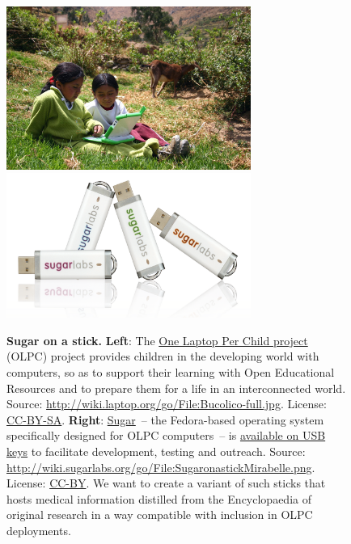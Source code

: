 \documentclass[final,authoryear,3p]{elsarticle-open-drafting}
\begin{document}
\begin{figure}[!h]
	\begin{center}
		\includegraphics[width=8cm]{Images/Bucolico-full-jpg2png.png}
		\includegraphics[width=8cm]{Images/SugaronastickMirabelle-cropped.png}
		\caption{
		{\bf Sugar on a stick.} {\bf Left}: The
		\href{http://laptop.org}{One Laptop Per Child  project} (OLPC) project 
		provides children in the developing world with computers,
		so as to support their learning with Open Educational Resources
		and to prepare them for a life in an interconnected world.
		Source: \href{http://wiki.laptop.org/index.php?title=File:Bucolico-full.jpg&oldid=236563}{http://wiki.laptop.org/go/File:Bucolico-full.jpg}. License: \href{http://creativecommons.org/licenses/by-sa/3.0/}{CC-BY-SA}.
		{\bf Right}: 
		\href{http://sugarlabs.org/}{Sugar}~-- 
		the Fedora-based operating system specifically designed for OLPC computers~-- 
		is \href{http://spins.fedoraproject.org/soas/}{available on USB keys} 
		to facilitate development, testing and outreach. 
		Source: \href{http://wiki.sugarlabs.org/index.php?title=File:SugaronastickMirabelle.png&oldid=52111}{http://wiki.sugarlabs.org/go/File:SugaronastickMirabelle.png}. License: \href{http://creativecommons.org/licenses/by/3.0/}{CC-BY}.
		We want to create a variant of 
		such sticks that hosts medical information distilled 
		from the Encyclopaedia of original research in a way compatible with inclusion in OLPC deployments.
		}
		\label{Figure:Sugaronastick}
	\end{center}
\end{figure}
\end{document}
